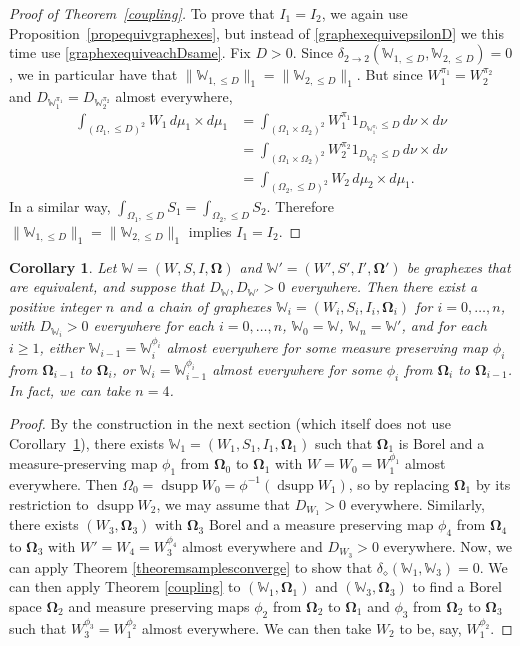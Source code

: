\documentclass{amsart}
\numberwithin{equation}{section}
\numberwithin{figure}{section}
\newtheorem{corollary}[theorem]{Corollary}
\theoremstyle{definition}
\theoremstyle{remark}
\DeclareMathOperator{\dsupp}{dsupp}
\newcommand{\bOmega}{{\mathbf{\Omega}}}
\newcommand{\cW}{\mathbb{W}}
\newcommand{\deltt}{\delta_{2\to 2}}
\def\delGP{\delta_\diamond}
\begin{document}
\begin{proof}[Proof of Theorem~\ref{coupling}]
To prove that $I_1=I_2$, we again use Proposition~\ref{propequivgraphexes},
but instead of \eqref{graphexequivepsilonD} we this time use
\eqref{graphexequiveachDsame}. Fix $D>0$. Since $\deltt(\cW_{1,{\leq
D}},\cW_{2,{\leq D}})=0$, we in particular have that $\|\cW_{1,\leq
D}\|_1=\|\cW_{2,\leq D}\|_1$. But since $W_1^{\pi_1}=W_2^{\pi_2}$ and
$D_{\cW_1^{\pi_1}}= D_{\cW_2^{\pi_2}}$ almost everywhere,
\begin{align*}
\int_{(\Omega_1,\leq D)^2}W_1\,d\mu_1\times d\mu_1
&=\int_{(\Omega_1\times\Omega_2)^2}W_1^{\pi_1}1_{D_{\cW_1^{\pi_1}}\leq D}\,d\nu\times d\nu\\
&=\int_{(\Omega_1\times\Omega_2)^2}W_2^{\pi_2}1_{D_{\cW_2^{\pi_2}}\leq D}\,d\nu\times d\nu\\
&=\int_{(\Omega_2,\leq D)^2}W_2\,d\mu_2\times d\mu_1.
\end{align*}
In a similar way, $\int_{\Omega_1,\leq D}S_1=\int_{\Omega_2,\leq D}S_2$.
Therefore $\|\cW_{1,\leq D}\|_1=\|\cW_{2,\leq D}\|_1$ implies $I_1=I_2$.
\end{proof}

\begin{corollary} \label{chain}
Let $\cW=(W,S,I,\bOmega)$ and $\cW'=(W',S',I',\bOmega')$ be graphexes that
are equivalent, and suppose that $D_\cW,D_{\cW'}>0$ everywhere. Then there
exist a positive integer $n$ and a chain of graphexes
$\cW_i=(W_i,S_i,I_i,\bOmega_i)$ for $i=0,\dots,n$, with $D_{\cW_i}>0$
everywhere for each $i=0,\dots,n$, $\cW_0=\cW$, $\cW_n=\cW'$, and for each $i
\ge 1$, either $\cW_{i-1}=\cW_i^{\phi_i}$ almost everywhere for some measure
preserving map $\phi_i$ from $\bOmega_{i-1}$ to $\bOmega_i$, or
$\cW_{i}=\cW_{i-1}^{\phi_i}$ almost everywhere for some $\phi_i$ from
$\bOmega_i$ to $\bOmega_{i-1}$. In fact, we can take $n=4$.
\end{corollary}

\begin{proof}
By the construction in the next section (which itself does not use
Corollary~\ref{chain}), there exists $\cW_1=(W_1,S_1,I_1,\bOmega_1)$ such
that $\bOmega_1$ is Borel and a measure-preserving map $\phi_1$ from
$\bOmega_0$ to $\bOmega_1$ with $W=W_0=W_1^{\phi_1}$ almost everywhere. Then
$\Omega_0=\dsupp W_0=\phi^{-1}(\dsupp W_1)$, so by replacing $\bOmega_1$ by
its restriction to $\dsupp W_2$, we may assume that $D_{W_1}>0$ everywhere.
Similarly, there exists $(W_3,\bOmega_3)$ with $\bOmega_3$ Borel and a
measure preserving map $\phi_4$ from $\bOmega_4$ to $\bOmega_3$ with
$W'=W_4=W_3^{\phi_4}$ almost everywhere and $D_{W_3}>0$ everywhere. Now, we
can apply Theorem \ref{theoremsamplesconverge} to show that
$\delGP(\cW_1,\cW_3)=0$. We can then apply Theorem \ref{coupling} to
$(\cW_1,\bOmega_1)$ and $(\cW_3,\bOmega_3)$ to find a Borel space $\bOmega_2$
and measure preserving maps $\phi_2$ from $\bOmega_2 $ to $\bOmega_1$ and
$\phi_3$ from $\bOmega_2$ to $\bOmega_3$ such that
$W_3^{\phi_3}=W_1^{\phi_2}$ almost everywhere. We can then take $W_2$ to be,
say, $W_1^{\phi_2}$.
\end{proof}
\end{document}
